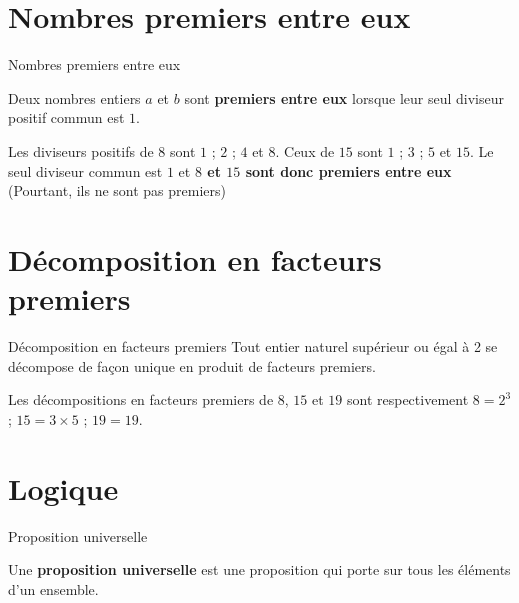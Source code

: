 \begin{pageCours}

\section{Nombres premiers entre eux}

  \begin{DefT}{Nombres premiers entre eux}

    Deux nombres entiers $a$ et $b$ sont \textbf{premiers entre eux}
    lorsque leur seul diviseur positif commun est $1$.
  \end{DefT}

\begin{Ex}
  Les diviseurs positifs de $8$ sont $1$ ; $2$ ; $4$ et $8$. Ceux de $15$ sont
  $1$ ; $3$ ; $5$ et $15$. Le seul diviseur commun est $1$ et \textbf{$8$ et $15$ sont donc premiers entre eux} (Pourtant, ils ne sont pas premiers)
\end{Ex}

\section{Décomposition en facteurs premiers}

  \begin{ThT}{Décomposition en facteurs premiers}
    Tout entier naturel supérieur ou égal à 2 se décompose de façon unique en produit de facteurs premiers.
  \end{ThT}


\begin{Exs}
Les décompositions en facteurs premiers de $8$, $15$ et $19$ sont respectivement  
$8=2^3$ ; $15=3 \times 5$ ; $19=19$.
  
\end{Exs}







\section{Logique}

 
\begin{DefT}{Proposition universelle}

  Une \textbf{proposition universelle} est une proposition qui porte sur tous
  les éléments d'un ensemble. 

\end{DefT}
 

\end{pageCours}
